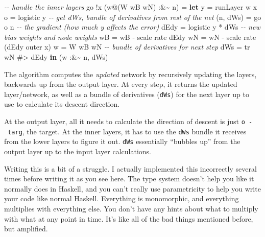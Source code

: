 \documentclass[]{article}
\newenvironment{Shaded}{}{}
\newcommand{\CommentTok}[1]{\textcolor[rgb]{0.38,0.63,0.69}{\textit{#1}}}
\newcommand{\DataTypeTok}[1]{\textcolor[rgb]{0.56,0.13,0.00}{#1}}
\newcommand{\KeywordTok}[1]{\textcolor[rgb]{0.00,0.44,0.13}{\textbf{#1}}}
\newcommand{\NormalTok}[1]{#1}
\newcommand{\OperatorTok}[1]{\textcolor[rgb]{0.40,0.40,0.40}{#1}}
\newcommand{\OtherTok}[1]{\textcolor[rgb]{0.00,0.44,0.13}{#1}}
\begin{document}
\begin{Shaded}
\begin{Highlighting}[]
    \CommentTok{{-}{-} handle the inner layers}
\NormalTok{    go }\OperatorTok{!}\NormalTok{x (w}\OperatorTok{@}\NormalTok{(}\DataTypeTok{W}\NormalTok{ wB wN) }\OperatorTok{:\&\textasciitilde{}}\NormalTok{ n)}
        \OtherTok{=} \KeywordTok{let}\NormalTok{ y          }\OtherTok{=}\NormalTok{ runLayer w x}
\NormalTok{              o          }\OtherTok{=}\NormalTok{ logistic y}
              \CommentTok{{-}{-} get dWs\textquotesingle{}, bundle of derivatives from rest of the net}
\NormalTok{              (n\textquotesingle{}, dWs\textquotesingle{}) }\OtherTok{=}\NormalTok{ go o n}
              \CommentTok{{-}{-} the gradient (how much y affects the error)}
\NormalTok{              dEdy       }\OtherTok{=}\NormalTok{ logistic\textquotesingle{} y }\OperatorTok{*}\NormalTok{ dWs\textquotesingle{}}
              \CommentTok{{-}{-} new bias weights and node weights}
\NormalTok{              wB\textquotesingle{}  }\OtherTok{=}\NormalTok{ wB }\OperatorTok{{-}}\NormalTok{ scale rate dEdy}
\NormalTok{              wN\textquotesingle{}  }\OtherTok{=}\NormalTok{ wN }\OperatorTok{{-}}\NormalTok{ scale rate (dEdy }\OtherTok{\textasciigrave{}outer\textasciigrave{}}\NormalTok{ x)}
\NormalTok{              w\textquotesingle{}   }\OtherTok{=} \DataTypeTok{W}\NormalTok{ wB\textquotesingle{} wN\textquotesingle{}}
              \CommentTok{{-}{-} bundle of derivatives for next step}
\NormalTok{              dWs  }\OtherTok{=}\NormalTok{ tr wN }\OperatorTok{\#>}\NormalTok{ dEdy}
          \KeywordTok{in}\NormalTok{  (w\textquotesingle{} }\OperatorTok{:\&\textasciitilde{}}\NormalTok{ n\textquotesingle{}, dWs)}
\end{Highlighting}
\end{Shaded}

The algorithm computes the \emph{updated} network by recursively updating the
layers, backwards up from the output layer. At every step, it returns the
updated layer/network, as well as a bundle of derivatives (\texttt{dWs}) for the
next layer up to use to calculate its descent direction.

At the output layer, all it needs to calculate the direction of descent is just
\texttt{o\ -\ targ}, the target. At the inner layers, it has to use the
\texttt{dWs} bundle it receives from the lower layers to figure it out.
\texttt{dWs} essentially ``bubbles up'' from the output layer up to the input
layer calculations.

Writing this is a bit of a struggle. I actually implemented this incorrectly
several times before writing it as you see here. The type system doesn't help
you like it normally does in Haskell, and you can't really use parametricity to
help you write your code like normal Haskell. Everything is monomorphic, and
everything multiplies with everything else. You don't have any hints about what
to multiply with what at any point in time. It's like all of the bad things
mentioned before, but amplified.
\end{document}
